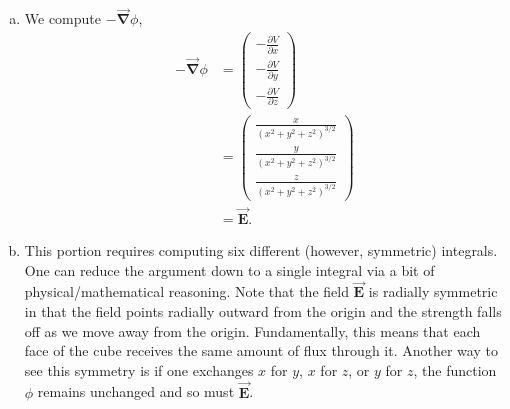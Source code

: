 \documentclass[12pt]{article} %
\newcommand{\grad}{\boldsymbol{\vec{\nabla}}}
\newcommand{\vecfieldE}{\boldsymbol{\vec{E}}}
\begin{document}
\begin{solution}
    \begin{enumerate}[(a)]
        \item   We compute $-\grad \phi$,
        \begin{align*}
            -\grad \phi &= \begin{pmatrix} -\frac{\partial V}{\partial x} \\ -\frac{\partial V}{\partial y} \\ -\frac{\partial V}{\partial z} \end{pmatrix}\\
            &= \begin{pmatrix} \frac{x}{(x^2+y^2+z^2)^{3/2}} \\ \frac{y}{(x^2+y^2+z^2)^{3/2}} \\ \frac{z}{(x^2+y^2+z^2)^{3/2}} \end{pmatrix}\\
            &= \vecfieldE.
        \end{align*}
        \item This portion requires computing six different (however, symmetric) integrals.  One can reduce the argument down to a single integral via a bit of physical/mathematical reasoning. Note that the field $\vecfieldE$ is radially symmetric in that the field points radially outward from the origin and the strength falls off as we move away from the origin.  Fundamentally, this means that each face of the cube receives the same amount of flux through it. Another way to see this symmetry is if one exchanges $x$ for $y$, $x$ for $z$, 
or $y$ for $z$, the function $\phi$ remains unchanged and so must $\vecfieldE$.
        

\end{enumerate}
\end{solution}
\end{document}
